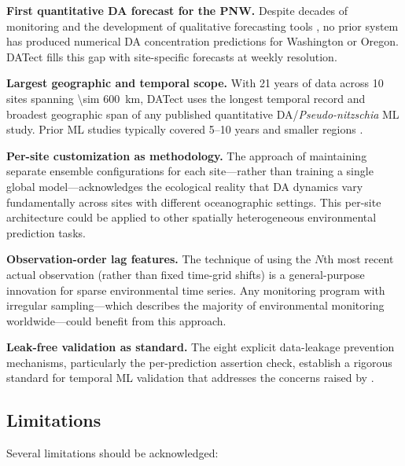\documentclass[preprint,12pt,authoryear]{elsarticle}
\begin{document}
\textbf{First quantitative DA forecast for the PNW.} Despite decades of monitoring and the development of qualitative forecasting tools \citep{McCabe2023}, no prior system has produced numerical DA concentration predictions for Washington or Oregon. DATect fills this gap with site-specific forecasts at weekly resolution.

\textbf{Largest geographic and temporal scope.} With 21 years of data across 10 sites spanning \SI{\sim 600}{\kilo\meter}, DATect uses the longest temporal record and broadest geographic span of any published quantitative DA/\textit{Pseudo-nitzschia} ML study. Prior ML studies typically covered 5--10 years and smaller regions \citep{Alaez2021, Grasso2019}.

\textbf{Per-site customization as methodology.} The approach of maintaining separate ensemble configurations for each site---rather than training a single global model---acknowledges the ecological reality that DA dynamics vary fundamentally across sites with different oceanographic settings. This per-site architecture could be applied to other spatially heterogeneous environmental prediction tasks.

\textbf{Observation-order lag features.} The technique of using the $N$th most recent actual observation (rather than fixed time-grid shifts) is a general-purpose innovation for sparse environmental time series. Any monitoring program with irregular sampling---which describes the majority of environmental monitoring worldwide---could benefit from this approach.

\textbf{Leak-free validation as standard.} The eight explicit data-leakage prevention mechanisms, particularly the per-prediction assertion check, establish a rigorous standard for temporal ML validation that addresses the concerns raised by \citet{Kapoor2023}.

\subsection{Limitations}
\label{sec:discussion-limitations}

Several limitations should be acknowledged:
\end{document}
